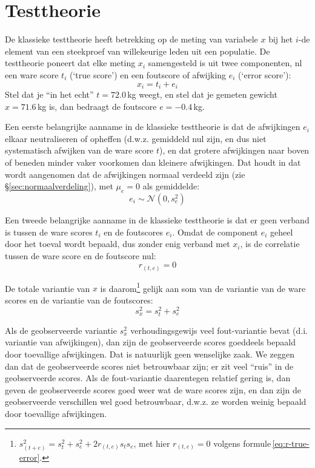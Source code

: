 \documentclass[
]{book}
\begin{document}
\hypertarget{testtheorie}{%
\section{Testtheorie}\label{testtheorie}}

De klassieke testtheorie heeft betrekking op de meting van variabele \(x\)
bij het \(i\)-de element van een steekproef van willekeurige leden uit een
populatie. De testtheorie poneert dat elke meting \(x_i\) samengesteld is
uit twee componenten, nl een ware score \(t_i\) (`true score') en een
foutscore of afwijking \(e_i\) (`error score'):
\begin{equation}
  x_i = t_i + e_i
  \label{eq:obs-true-error}
\end{equation}
Stel dat je ``in het echt'' \(t=72.0\) kg weegt, en stel
dat je gemeten gewicht \(x=71.6\) kg is, dan bedraagt de foutscore
\(e=-0.4\) kg.

Een eerste belangrijke aanname in de klassieke testtheorie is dat de
afwijkingen \(e_i\) elkaar neutraliseren of opheffen (d.w.z. gemiddeld nul
zijn, en dus niet systematisch afwijken van de ware score \(t\)), en dat
grotere afwijkingen naar boven of beneden minder vaker voorkomen dan
kleinere afwijkingen. Dat houdt in dat wordt aangenomen dat de
afwijkingen normaal verdeeld zijn (zie
§\ref{sec:normaalverdeling}), met \(\mu_e=0\) als gemiddelde:
\begin{equation}
  \label{eq:normal-error}
  e_i \sim \mathcal{N}(0,s^2_e)
\end{equation}

Een tweede belangrijke aanname in de klassieke testtheorie is dat er
geen verband is tussen de ware scores \(t_i\) en de foutscores \(e_i\).
Omdat de component \(e_i\) geheel door het toeval wordt bepaald, dus
zonder enig verband met \(x_i\), is de correlatie tussen de ware score en
de foutscore nul:
\begin{equation}
  \label{eq:r-true-error}
  r_{(t,e)} = 0
\end{equation}

De totale variantie van \(x\) is daarom\footnote{\(s^2_{(t+e)} = s^2_t + s^2_e + 2 r_{(t,e)} s_t s_e\), met hier \(r_{(t,e)}=0\) volgens formule \eqref{eq:r-true-error}.} gelijk aan som van de
variantie van de ware scores en de variantie van de foutscores:
\begin{equation}
  \label{eq:var-true-error}
  s^2_x = s^2_t + s^2_e
\end{equation}

Als de geobserveerde variantie \(s^2_x\) verhoudingsgewijs veel
fout-variantie bevat (d.i. variantie van afwijkingen), dan zijn de
geobserveerde scores goeddeels bepaald door toevallige afwijkingen. Dat
is natuurlijk geen wenselijke zaak. We zeggen dan dat de geobserveerde
scores niet betrouwbaar zijn; er zit veel ``ruis'' in de geobserveerde
scores. Als de fout-variantie daarentegen relatief gering is, dan geven
de geobserveerde scores goed weer wat de ware scores zijn, en dan zijn
de geobserveerde verschillen wel goed betrouwbaar, d.w.z. ze worden
weinig bepaald door toevallige afwijkingen.
\end{document}
